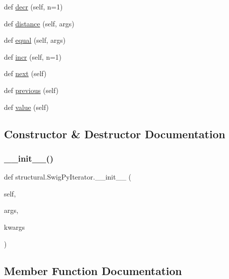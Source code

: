 \begin{DoxyCompactItemize}
\item 
def \hyperlink{classstructural_1_1_swig_py_iterator_a14daa6ffac6f5ca7675b605eab024c5e}{decr} (self, n=1)
\item 
def \hyperlink{classstructural_1_1_swig_py_iterator_aaa0679f2c8e8f1473c9aed9d7ffde419}{distance} (self, args)
\item 
def \hyperlink{classstructural_1_1_swig_py_iterator_aa4e5051c57d1f41c43aa1ea0a3c02d14}{equal} (self, args)
\item 
def \hyperlink{classstructural_1_1_swig_py_iterator_a8cabfbe8bf2387354c161871f1892c50}{incr} (self, n=1)
\item 
def \hyperlink{classstructural_1_1_swig_py_iterator_a02769e3644de7150500905e1d9579c05}{next} (self)
\item 
def \hyperlink{classstructural_1_1_swig_py_iterator_a6416e521ed806d4ca6d49fea9ca9ae2b}{previous} (self)
\item 
def \hyperlink{classstructural_1_1_swig_py_iterator_aa0a1ad60e19c436e3b82a71d31050132}{value} (self)
\end{DoxyCompactItemize}


\subsection{Constructor \& Destructor Documentation}
\mbox{\label{classstructural_1_1_swig_py_iterator_a050f056f9b2c92db7b79afcfe11a525b}} 
\subsubsection{\texorpdfstring{\+\_\+\+\_\+init\+\_\+\+\_\+()}{\_\_init\_\_()}}
{\footnotesize\ttfamily def structural.\+Swig\+Py\+Iterator.\+\_\+\+\_\+init\+\_\+\+\_\+ (\begin{DoxyParamCaption}\item[{}]{self,  }\item[{}]{args,  }\item[{}]{kwargs }\end{DoxyParamCaption})}



\subsection{Member Function Documentation}
\mbox{\label{classstructural_1_1_swig_py_iterator_a65714058f2d811f3f3c4bbbaa8094e29}} 
